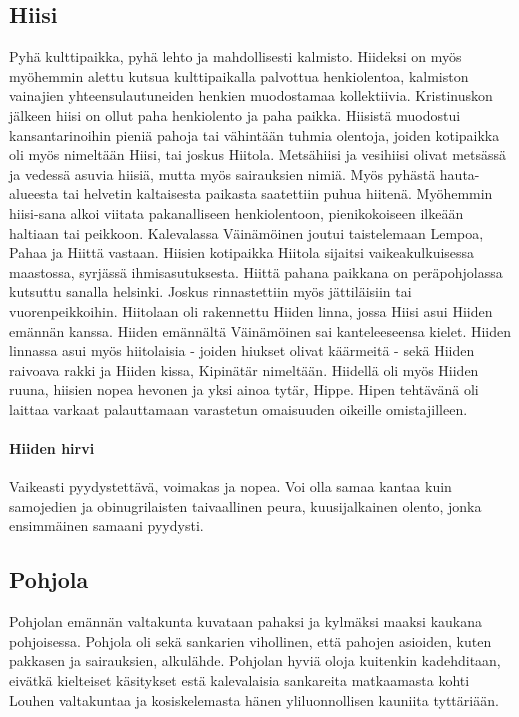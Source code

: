 \subsection{Hiisi} 

  Pyhä kulttipaikka, pyhä lehto ja mahdollisesti kalmisto. Hiideksi on myös myöhemmin alettu 
  kutsua kulttipaikalla palvottua henkiolentoa, kalmiston vainajien yhteensulautuneiden henkien 
  muodostamaa kollektiivia. Kristinuskon jälkeen hiisi on ollut paha henkiolento ja paha paikka. 
  Hiisistä muodostui kansantarinoihin pieniä pahoja tai vähintään tuhmia olentoja, joiden 
  kotipaikka oli myös nimeltään Hiisi, tai joskus Hiitola. Metsähiisi ja vesihiisi olivat 
  metsässä ja vedessä asuvia hiisiä, mutta myös sairauksien nimiä. Myös pyhästä hauta-alueesta 
  tai helvetin kaltaisesta paikasta saatettiin puhua hiitenä. Myöhemmin hiisi-sana alkoi viitata 
  pakanalliseen henkiolentoon, pienikokoiseen ilkeään haltiaan tai peikkoon. Kalevalassa 
  Väinämöinen joutui taistelemaan Lempoa, Pahaa ja Hiittä vastaan. Hiisien kotipaikka Hiitola 
  sijaitsi vaikeakulkuisessa maastossa, syrjässä ihmisasutuksesta. Hiittä pahana paikkana on 
  peräpohjolassa kutsuttu sanalla helsinki. Joskus rinnastettiin myös jättiläisiin tai 
  vuorenpeikkoihin. Hiitolaan oli rakennettu Hiiden linna, jossa Hiisi asui Hiiden emännän 
  kanssa. Hiiden emännältä Väinämöinen sai kanteleeseensa kielet. Hiiden linnassa asui myös 
  hiitolaisia - joiden hiukset olivat käärmeitä - sekä Hiiden raivoava rakki ja Hiiden kissa, 
  Kipinätär nimeltään. Hiidellä oli myös Hiiden ruuna, hiisien nopea hevonen ja yksi ainoa 
  tytär, Hippe. Hipen tehtävänä oli laittaa varkaat palauttamaan varastetun omaisuuden oikeille 
  omistajilleen. 
  
  \paragraph{Hiiden hirvi} Vaikeasti pyydystettävä, voimakas ja nopea. Voi olla samaa kantaa 
    kuin samojedien ja obinugrilaisten taivaallinen peura, kuusijalkainen olento, jonka 
    ensimmäinen samaani pyydysti. 



\subsection{Pohjola}
  Pohjolan emännän valtakunta kuvataan pahaksi ja kylmäksi maaksi kaukana pohjoisessa. Pohjola 
  oli sekä sankarien vihollinen, että pahojen asioiden, kuten pakkasen ja sairauksien, alkulähde. 
  Pohjolan hyviä oloja kuitenkin kadehditaan, eivätkä kielteiset käsitykset estä kalevalaisia 
  sankareita matkaamasta kohti Louhen valtakuntaa ja kosiskelemasta hänen yliluonnollisen 
  kauniita tyttäriään.
  
